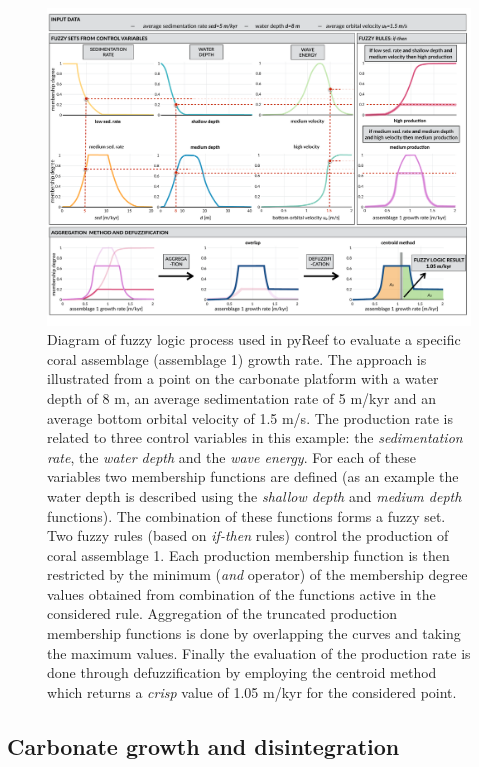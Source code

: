 \documentclass[default,jgrga]{agutex2015}
\begin{document}
\begin{article}
\begin{figure}
\centering
\noindent\includegraphics[width=37pc]{figs/fig3.pdf}
\caption{Diagram of fuzzy logic process used in pyReef to evaluate a specific coral assemblage (assemblage 1) growth rate. The approach is illustrated from a point on the carbonate platform with a water depth of 8 m, an average sedimentation rate of 5 m/kyr and an average bottom orbital velocity of 1.5 m/s. The production rate is related to three control variables in this example: the \textit{sedimentation rate}, the \textit{water depth} and the \textit{wave energy}. For each of these variables two membership functions are defined (as an example the water depth is described using the \textit{shallow depth} and \textit{medium depth} functions). The combination of these functions forms a fuzzy set. Two fuzzy rules (based on \textit{if-then} rules) control the production of coral assemblage 1. Each production membership function is then restricted by the minimum (\textit{and} operator) of the membership degree values obtained from combination of the functions active in the considered rule. Aggregation of the truncated production membership functions is done by overlapping the curves and taking the maximum values. Finally the evaluation of the production rate is done through defuzzification by employing the centroid method which returns a \textit{crisp} value of 1.05 m/kyr for the considered point.
}
\label{fuzzyfig}
\end{figure}

\subsection{Carbonate growth and disintegration}\label{fuzzy}


\end{article}
\end{document}
